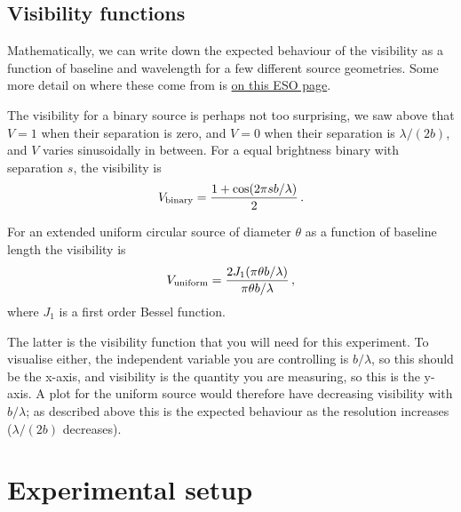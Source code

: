 \documentclass[11pt]{article}
\begin{document}
\subsection{Visibility functions}

Mathematically, we can write down the expected behaviour of the visibility as a function of baseline and wavelength for a few different source geometries. Some more detail on where these come from is \href{https://www.eso.org/sci/facilities/paranal/telescopes/vlti/tuto/tutorial_interferometry.html}{on this ESO page}.

The visibility for a binary source is perhaps not too surprising, we saw above that $V=1$ when their separation is zero, and $V=0$ when their separation is $\lambda/(2b)$, and $V$ varies sinusoidally in between. For a equal brightness binary with separation $s$, the visibility is
\begin{equation}
    V_{\rm binary} = \frac{1 + \cos ( 2 \pi s b / \lambda )}{2} \, .
\end{equation}

For an extended uniform circular source of diameter $\theta$ as a function of baseline length the visibility is
\begin{equation}
    V_{\rm uniform} = \frac{2 J_1(\pi \theta b / \lambda)}{\pi \theta b / \lambda} \, ,
\end{equation}
where $J_1$ is a first order Bessel function.

The latter is the visibility function that you will need for this experiment. To visualise either, the independent variable you are controlling is $b/\lambda$, so this should be the x-axis, and visibility is the quantity you are measuring, so this is the y-axis. A plot for the uniform source would therefore have decreasing visibility with $b/\lambda$; as described above this is the expected behaviour as the resolution increases ($\lambda/(2b)$ decreases).

\clearpage
\section{Experimental setup}
\end{document}
